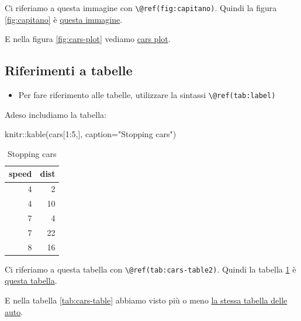\documentclass[a4paper, 11pt, nobind]{templates/ociamthesis}
\providecommand{\tightlist}{%
  \setlength{\itemsep}{0pt}\setlength{\parskip}{0pt}}
\newenvironment{Shaded}{\begin{snugshade}}{\end{snugshade}}
\newcommand{\AttributeTok}[1]{\textcolor[rgb]{0.77,0.63,0.00}{#1}}
\newcommand{\DecValTok}[1]{\textcolor[rgb]{0.00,0.00,0.81}{#1}}
\newcommand{\FunctionTok}[1]{\textcolor[rgb]{0.00,0.00,0.00}{#1}}
\newcommand{\NormalTok}[1]{#1}
\newcommand{\SpecialCharTok}[1]{\textcolor[rgb]{0.00,0.00,0.00}{#1}}
\newcommand{\StringTok}[1]{\textcolor[rgb]{0.31,0.60,0.02}{#1}}
\renewenvironment{Shaded}
{
  \vspace{10pt}%
  \begin{snugshade}%
}{%
  \end{snugshade}%
  \vspace{8pt}%
}
\begin{document}
Ci riferiamo a questa immagine con \texttt{\textbackslash{}@ref(fig:capitano)}.
Quindi la figura \ref{fig:capitano} è \protect\hyperlink{fig:capitano}{questa immagine}.

E nella figura \ref{fig:cars-plot} vediamo \protect\hyperlink{fig:cars-plot}{cars plot}.

\hypertarget{riferimenti-a-tabelle}{%
\subsection{Riferimenti a tabelle}\label{riferimenti-a-tabelle}}

\begin{itemize}
\tightlist
\item
  Per fare riferimento alle tabelle, utilizzare la sintassi \texttt{\textbackslash{}@ref(tab:label)}
\end{itemize}

Adeso includiamo la tabella:

\begin{Shaded}
\begin{Highlighting}[]
\NormalTok{knitr}\SpecialCharTok{::}\FunctionTok{kable}\NormalTok{(cars[}\DecValTok{1}\SpecialCharTok{:}\DecValTok{5}\NormalTok{,],}
            \AttributeTok{caption=}\StringTok{"Stopping cars"}\NormalTok{)}
\end{Highlighting}
\end{Shaded}

\begin{table}

\caption{\label{tab:cars-table2}Stopping cars}
\centering
\begin{tabular}[t]{r|r}
\hline
speed & dist\\
\hline
4 & 2\\
\hline
4 & 10\\
\hline
7 & 4\\
\hline
7 & 22\\
\hline
8 & 16\\
\hline
\end{tabular}
\end{table}

Ci riferiamo a questa tabella con \texttt{\textbackslash{}@ref(tab:cars-table2)}.
Quindi la tabella \ref{tab:cars-table2} è \protect\hyperlink{tab:cars-table2}{questa tabella}.

E nella tabella \ref{tab:cars-table} abbiamo visto più o meno \protect\hyperlink{tab:cars-table}{la stessa tabella delle auto}.
\end{document}
